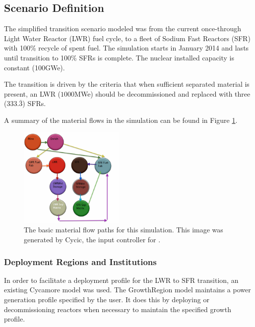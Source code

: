 \subsection{Scenario Definition}
The simplified transition scenario modeled was from the current once-through
Light Water Reactor (LWR) fuel cycle, to a fleet of Sodium Fast Reactors (SFR)
with 100\% recycle of spent fuel.  The simulation starts in January 2014 and
lasts until transition to 100\% SFRs is complete. The nuclear installed
capacity is constant (100GWe).

The transition is driven by the criteria that when sufficient separated
material is present, an LWR ($1000$MWe) should be decommissioned and replaced
with three ($333.\bar{3}$) SFRs.

A summary of the material flows in the simulation can be found in Figure 
\ref{fig:cycic_img}. 

\begin{figure}[htpb!]
\begin{center}
\includegraphics[width=0.45\textwidth]{cycic_img.eps}
\end{center}
\caption{The basic material flow paths for this simulation. This image was 
generated by Cycic, the input controller for \Cyclus 
\cite{flanagan_input_2013}.}
\label{fig:cycic_img}
\end{figure}

\subsubsection{Deployment Regions and Institutions}

In order to facilitate a deployment profile for the LWR to SFR transition, an 
existing Cycamore model was used. The GrowthRegion model maintains a 
power generation profile specified by the user. It does this by deploying or 
decommissioning reactors when necessary to maintain the specified growth 
profile.  

